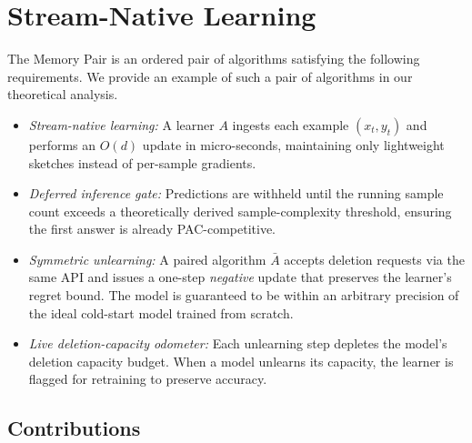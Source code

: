\documentclass{article}
\theoremstyle{ssltheorem}
\begin{document}
\section{Stream-Native Learning}
\label{sec:stream-native}

The Memory Pair is an ordered pair of algorithms satisfying the following requirements.
We provide an example of such a pair of algorithms in our theoretical analysis.
\begin{itemize}
    \item \textit{Stream-native learning:} A learner $A$ ingests each example $(x_{t},y_{t})$ and performs an $O(d)$ update in micro-seconds, maintaining only lightweight sketches instead of per-sample gradients.
\item \textit{Deferred inference gate:} Predictions are withheld until the running sample count exceeds a theoretically derived sample-complexity threshold, ensuring the first answer is already PAC-competitive.
\item \textit{Symmetric unlearning:} A paired algorithm $\bar{A}$ accepts deletion requests via the same API and issues a one-step \textit{negative} update that preserves the learner’s regret bound.
The model is guaranteed to be within an arbitrary precision of the ideal cold-start model trained from scratch.
\item \textit{Live deletion-capacity odometer:} Each unlearning step depletes the model's deletion capacity budget.
When a model unlearns its capacity, the learner is flagged for retraining to preserve accuracy.
\end{itemize}
\subsection{Contributions}
\label{subsec:contributions}
\end{document}
